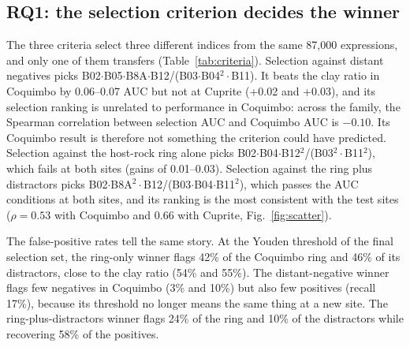 \documentclass[preprint,authoryear,number]{elsarticle}
\begin{document}
\subsection{RQ1: the selection criterion decides the winner}
\label{sec:rq1}

The three criteria select three different indices from the same 87{,}000 expressions, and only one of them transfers (Table~\ref{tab:criteria}). Selection against distant negatives picks B02$\cdot$B05$\cdot$B8A$\cdot$B12/(B03$\cdot$B04$^2\cdot$B11). It beats the clay ratio in Coquimbo by 0.06--0.07 AUC but not at Cuprite (+0.02 and +0.03), and its selection ranking is unrelated to performance in Coquimbo: across the family, the Spearman correlation between selection AUC and Coquimbo AUC is $-0.10$. Its Coquimbo result is therefore not something the criterion could have predicted. Selection against the host-rock ring alone picks B02$\cdot$B04$\cdot$B12$^2$/(B03$^2\cdot$B11$^2$), which fails at both sites (gains of 0.01--0.03). Selection against the ring plus distractors picks B02$\cdot$B8A$^2\cdot$B12/(B03$\cdot$B04$\cdot$B11$^2$), which passes the AUC conditions at both sites, and its ranking is the most consistent with the test sites ($\rho = 0.53$ with Coquimbo and $0.66$ with Cuprite, Fig.~\ref{fig:scatter}).

The false-positive rates tell the same story. At the Youden threshold of the final selection set, the ring-only winner flags 42\% of the Coquimbo ring and 46\% of its distractors, close to the clay ratio (54\% and 55\%). The distant-negative winner flags few negatives in Coquimbo (3\% and 10\%) but also few positives (recall 17\%), because its threshold no longer means the same thing at a new site. The ring-plus-distractors winner flags 24\% of the ring and 10\% of the distractors while recovering 58\% of the positives.

\begin{table}[ht]
\centering
\caption{Winner of the same 87{,}000-expression family under three selection criteria, evaluated on the same test sets. $\Delta$ = AUC gain over the clay ratio (ring / ring + distractors). $\rho$ = Spearman correlation, across the family, between selection AUC and test AUC (ring + distractors). Gate = AUC conditions (i) and (ii) of Section~\ref{sec:gate}.}
\label{tab:criteria}
\end{table}
\end{document}
